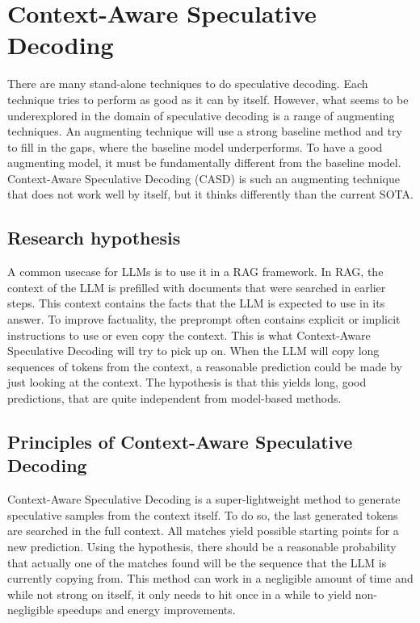 
\chapter{Context-Aware Speculative Decoding}

There are many stand-alone techniques to do speculative decoding. Each technique tries to perform as good as it can by itself. However, what seems to be underexplored in the domain of speculative decoding is a range of augmenting techniques. An augmenting technique will use a strong baseline method and try to fill in the gaps, where the baseline model underperforms. To have a good augmenting model, it must be fundamentally different from the baseline model. Context-Aware Speculative Decoding (CASD) is such an augmenting technique that does not work well by itself, but it thinks differently than the current SOTA.

\section{Research hypothesis}
A common usecase for LLMs is to use it in a RAG framework. In RAG, the context of the LLM is prefilled with documents that were searched in earlier steps. This context contains the facts that the LLM is expected to use in its answer. To improve factuality, the preprompt often contains explicit or implicit instructions to use or even copy the context. This is what Context-Aware Speculative Decoding will try to pick up on. When the LLM will copy long sequences of tokens from the context, a reasonable prediction could be made by just looking at the context. The hypothesis is that this yields long, good predictions, that are quite independent from model-based methods.

\section{Principles of Context-Aware Speculative Decoding}
Context-Aware Speculative Decoding is a super-lightweight method to generate speculative samples from the context itself. To do so, the last generated tokens are searched in the full context. All matches yield possible starting points for a new prediction. Using the hypothesis, there should be a reasonable probability that actually one of the matches found will be the sequence that the LLM is currently copying from. This method can work in a negligible amount of time and while not strong on itself, it only needs to hit once in a while to yield non-negligible speedups and energy improvements.

